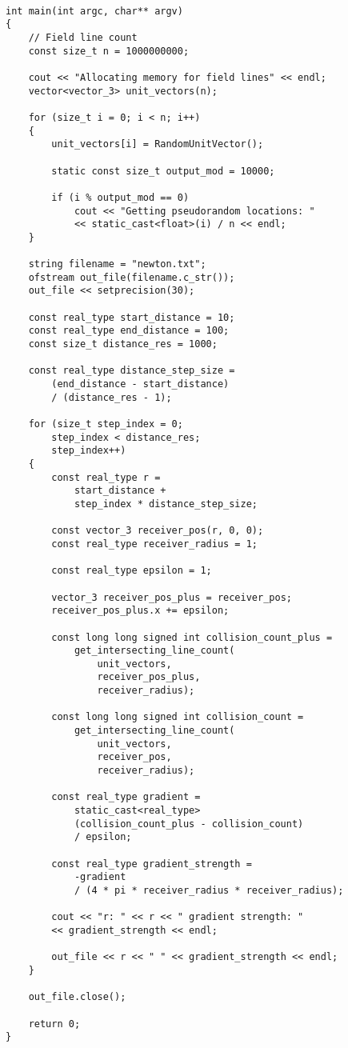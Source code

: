 \documentclass[12pt]{article}
\begin{document}
\begin{lstlisting}

int main(int argc, char** argv)
{
	// Field line count
	const size_t n = 1000000000;

	cout << "Allocating memory for field lines" << endl;
	vector<vector_3> unit_vectors(n);

	for (size_t i = 0; i < n; i++)
	{
		unit_vectors[i] = RandomUnitVector();

		static const size_t output_mod = 10000;

		if (i % output_mod == 0)
			cout << "Getting pseudorandom locations: " 
			<< static_cast<float>(i) / n << endl;
	}

	string filename = "newton.txt";
	ofstream out_file(filename.c_str());
	out_file << setprecision(30);

	const real_type start_distance = 10;
	const real_type end_distance = 100;
	const size_t distance_res = 1000;

	const real_type distance_step_size = 
		(end_distance - start_distance) 
		/ (distance_res - 1);

	for (size_t step_index = 0;
		step_index < distance_res; 
		step_index++)
	{
		const real_type r = 
			start_distance + 
			step_index * distance_step_size;

		const vector_3 receiver_pos(r, 0, 0);
		const real_type receiver_radius = 1;

		const real_type epsilon = 1;

		vector_3 receiver_pos_plus = receiver_pos;
		receiver_pos_plus.x += epsilon;

		const long long signed int collision_count_plus = 
			get_intersecting_line_count(
				unit_vectors, 
				receiver_pos_plus, 
				receiver_radius);
		
		const long long signed int collision_count = 
			get_intersecting_line_count(
				unit_vectors, 
				receiver_pos, 
				receiver_radius);
		
		const real_type gradient = 
			static_cast<real_type>
			(collision_count_plus - collision_count) 
			/ epsilon;
		
		const real_type gradient_strength = 
			-gradient 
			/ (4 * pi * receiver_radius * receiver_radius);

		cout << "r: " << r << " gradient strength: " 
		<< gradient_strength << endl;

		out_file << r << " " << gradient_strength << endl;
	}

	out_file.close();

	return 0;
}

\end{lstlisting}
\end{document}
